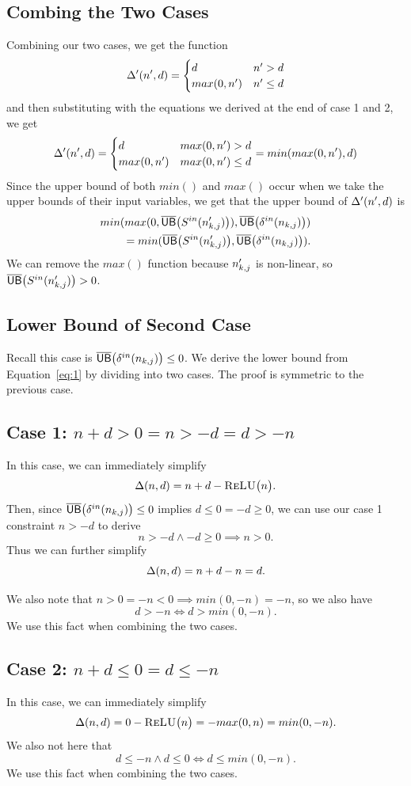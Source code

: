 \subsection*{Combing the Two Cases}
Combining our two cases, we get the function
\[
	\Delta'(n',d) = \begin{cases}
	d & n' > d\\
	max(0, n') & n' \leq d
	\end{cases}
\]
and then substituting with the equations we derived at the end of case 1 and 2, we get
\[
\Delta'(n',d) = \begin{cases}
d & max(0, n') > d\\
max(0, n') & max(0, n') \leq d
\end{cases} = min(max(0, n'), d)
\]
Since the upper bound of both $ min() $ and $ max() $ occur when we take the upper bounds of their input variables, we get that the upper bound of $ \Delta'(n',d) $ is
\begin{align*}
min(max(0, \overline{\mathsf{UB}}\big(S^{in}(n'_{k,j})\big)), \overline{\mathsf{UB}}\big(\delta^{in}(n_{k,j})\big))\\
= min(\overline{\mathsf{UB}}\big(S^{in}(n'_{k,j})\big), \overline{\mathsf{UB}}\big(\delta^{in}(n_{k,j})\big)).
\end{align*}
We can remove the $ max() $ function because $ n'_{k,j} $ is non-linear, so
$ \overline{\mathsf{UB}}\big(S^{in}(n'_{k,j})\big) > 0 $.


\subsection{Lower Bound of Second Case}
Recall this case is $ \overline{\mathsf{UB}}\big(\delta^{in}(n_{k,j})\big) \leq 0 $. We derive the lower bound from Equation~\ref{eq:1} by dividing into two cases. The proof is symmetric to the previous case.
\subsection*{Case 1: $ n + d > 0 = n > -d = d > -n $}
In this case, we can immediately simplify
\[
	\Delta(n,d) = n + d - \textsc{ReLU}\big(n\big).
\]
Then, since $ \overline{\mathsf{UB}}\big(\delta^{in}(n_{k,j})\big) \leq 0 $ implies $ d \leq 0 = -d \geq 0 $,
we can use our case 1 constraint $ n > -d $ to derive
\[
	n > -d \wedge -d \geq 0 \implies n > 0.
\]
Thus we can further simplify
\[
	\Delta(n,d) = n + d - n = d.
\]

We also note that $ n > 0 = -n < 0 \implies min(0, -n) = -n $, so we also have
\[
	d > -n \iff d > min(0, -n).
\]
We use this fact when combining the two cases.

\subsection*{Case 2: $ n + d \leq 0 = d \leq -n $}
In this case, we can immediately simplify
\[
	\Delta(n,d) = 0 - \textsc{ReLU}\big(n\big) = -max(0, n) = min(0, -n).
\]
We also not here that
\[
	d \leq -n \wedge d \leq 0 \iff d \leq min(0, -n).
\]
We use this fact when combining the two cases.

